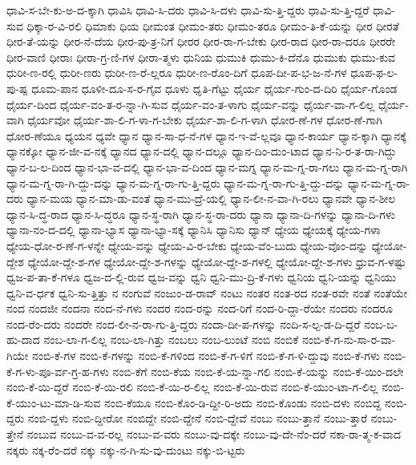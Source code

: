 {ಧಾವಿ-ಸ-ಬೇ-ಕು-ಅ-ದ-ಕ್ಕಾಗಿ
ಧಾವಿಸಿ
ಧಾವಿ-ಸಿ-ದರು
ಧಾವಿ-ಸಿ-ದಳು
ಧಾವಿ-ಸು-ತ್ತಿ-ದ್ದರು
ಧಾವಿ-ಸು-ತ್ತಿ-ದ್ದರೆ
ಧಾವಿ-ಸುವ
ಧಿಕ್ಕಾ-ರ-ವಿ-ರಲಿ
ಧಿಮಾಕು
ಧಿಯ
ಧೀಮಂತ
ಧೀಮಂ-ತರು
ಧೀಮಂ-ತರೂ
ಧೀಮಂ-ತಿ-ಕೆ-ಯನ್ನು
ಧೀರ
ಧೀರತೆ
ಧೀರ-ತೆ-ಯನ್ನು
ಧೀರ-ನೆ-ದೆಯ
ಧೀರ-ಪು-ತ್ರ-ನಿಗೆ
ಧೀರರ
ಧೀರ-ರಾ-ಗ-ಬೇಕು
ಧೀರ-ರಾದ
ಧೀರ-ರಾ-ದರೂ
ಧೀರರೇ
ಧೀರ-ವಾಣಿ
ಧೀರಾಃ
ಧೀರಾ-ಗ್ರ-ಣಿ-ಗಳ
ಧೀರಾ-ತ್ಮಳು
ಧುನಿಯ
ಧುಮುಕಿ
ಧುಮು-ಕಿ-ದೆನೊ
ಧುಮುಕು
ಧುಮು-ಕುವ
ಧುರೀ-ಣ-ರಲ್ಲಿ
ಧುರೀ-ಣರು
ಧುರೀ-ಣ-ರೆ-ಲ್ಲರೂ
ಧುರೀ-ಣ-ರೊಂ-ದಿಗೆ
ಧೂಪ-ದೀ-ಪ-ಭ-ಜ-ನೆ-ಗಳ
ಧೂಪ-ಫ-ಲ-ಪು-ಷ್ಪ
ಧೂಮ-ಪಾನ
ಧೂಳೀ-ದೂ-ಸ-ರ-ಗೈವ
ಧೂಳು
ಧೃತಿ-ಗೆಟ್ಟು
ಧೈರ್ಯ
ಧೈರ್ಯ-ಗುಂ-ದ-ದಿರಿ
ಧೈರ್ಯ-ಗೊಂಡ
ಧೈರ್ಯ-ದಿಂದ
ಧೈರ್ಯ-ವಂ-ತ-ರ-ನ್ನಾ-ಗಿ-ಸುವ
ಧೈರ್ಯ-ವಂ-ತ-ಳಾಗು
ಧೈರ್ಯ-ವನ್ನು
ಧೈರ್ಯ-ವಾ-ಗ-ಲಿಲ್ಲ
ಧೈರ್ಯ-ವಾಗಿ
ಧೈರ್ಯವೋ
ಧೈರ್ಯ-ಶಾ-ಲಿ-ಗ-ಳಾ-ಗ-ಬೇಕು
ಧೈರ್ಯ-ಶಾ-ಲಿ-ಗ-ಳಾಗಿ
ಧೋರ-ಣೆ-ಗಳ
ಧೋರ-ಣೆ-ಗಾಗಿ
ಧೋರ-ಣೆಯೂ
ಧ್ಯಯನ
ಧ್ಯವೇ
ಧ್ಯಾನ
ಧ್ಯಾನ-ಸಾ-ಧ-ನೆ-ಗಳ
ಧ್ಯಾನ-ಇ-ವೆ-ಲ್ಲವೂ
ಧ್ಯಾನ-ಕಾರ್ಯ
ಧ್ಯಾನ-ಕ್ಕಾಗಿ
ಧ್ಯಾನಕ್ಕೆ
ಧ್ಯಾನಕ್ಕೋ
ಧ್ಯಾನ-ಜೀ-ವ-ನಕ್ಕೆ
ಧ್ಯಾನದ
ಧ್ಯಾನ-ದಲ್ಲಿ
ಧ್ಯಾನ-ದಲ್ಲೂ
ಧ್ಯಾನ-ದಿಂ-ದುಂ-ಟಾದ
ಧ್ಯಾನ-ನಿ-ರ-ತ-ರಾ-ಗಿದ್ದು
ಧ್ಯಾನ-ಬ-ಲ-ದಿಂದ
ಧ್ಯಾನ-ಭಾ-ವ-ದಲ್ಲಿ
ಧ್ಯಾನ-ಭಾ-ವ-ದಿಂದ
ಧ್ಯಾನ-ಮಗ್ನ
ಧ್ಯಾನ-ಮ-ಗ್ನ-ರಾ-ಗಲು
ಧ್ಯಾನ-ಮ-ಗ್ನ-ರಾಗಿ
ಧ್ಯಾನ-ಮ-ಗ್ನ-ರಾ-ಗಿ-ದ್ದು-ದನ್ನು
ಧ್ಯಾನ-ಮ-ಗ್ನ-ರಾ-ಗು-ತ್ತಿ-ದ್ದರು
ಧ್ಯಾನ-ಮ-ಗ್ನ-ರಾ-ಗು-ತ್ತಿ-ದ್ದು-ದನ್ನು
ಧ್ಯಾನ-ಮ-ಗ್ನ-ರಾ-ದರು
ಧ್ಯಾನ-ಮಯ
ಧ್ಯಾನ-ಮಾ-ಡು-ವಂತೆ
ಧ್ಯಾನ-ಮು-ದ್ರೆ-ಯಲ್ಲಿ
ಧ್ಯಾನ-ಲೀ-ನ-ವಾ-ಗಿ-ರಲು
ಧ್ಯಾನವೇ
ಧ್ಯಾನ-ಶೀಲ
ಧ್ಯಾನ-ಸಿ-ದ್ಧ-ರಾದ
ಧ್ಯಾನ-ಸಿ-ದ್ಧರೂ
ಧ್ಯಾನ-ಸ್ಥ-ರಾಗಿ
ಧ್ಯಾನ-ಸ್ಥ-ರಾ-ದರು
ಧ್ಯಾನಾ
ಧ್ಯಾನಾ-ದಿ-ಗಳನ್ನು
ಧ್ಯಾನಾ-ದಿ-ಗಳು
ಧ್ಯಾನಾ-ನಂ-ದ-ದಲ್ಲಿ
ಧ್ಯಾನಾ-ಭ್ಯಾಸ
ಧ್ಯಾನಾ-ಭ್ಯಾ-ಸಕ್ಕೆ
ಧ್ಯಾನಿಸಿ
ಧ್ಯಾನಿಸು
ಧ್ಯಾನ್
ಧ್ಯೇಯ
ಧ್ಯೇಯಕ್ಕೆ
ಧ್ಯೇಯ-ಗಳಾ
ಧ್ಯೇಯ-ಧೋ-ರ-ಣೆ-ಗ-ಳನ್ನೇ
ಧ್ಯೇಯ-ವನ್ನು
ಧ್ಯೇಯ-ವಿ-ರ-ಬೇಕು
ಧ್ಯೇಯ-ವೆಂ-ಬುದು
ಧ್ಯೇಯ-ವೊಂ-ದನ್ನು
ಧ್ಯೇಯೋ-ದ್ದೇಶ
ಧ್ಯೇಯೋ-ದ್ದೇ-ಶ-ಗಳ
ಧ್ಯೇಯೋ-ದ್ದೇ-ಶ-ಗಳನ್ನು
ಧ್ಯೇಯೋ-ದ್ದೇ-ಶ-ಗಳಲ್ಲಿ
ಧ್ಯೇಯೋ-ದ್ದೇ-ಶ-ಗಳು
ಧ್ರುವ-ಗ-ಳಷ್ಟು
ಧ್ವಜ-ಪ-ತಾ-ಕೆ-ಗಳೂ
ಧ್ವಜ-ದ-ಲ್ಲಿ-ರುವ
ಧ್ವಜ-ವನ್ನು
ಧ್ವನಿ
ಧ್ವನಿ-ಮು-ದ್ರಿ-ಕೆ-ಗಳು
ಧ್ವನಿಯ
ಧ್ವನಿ-ಯನ್ನು
ಧ್ವನಿಯು
ಧ್ವನಿ-ವ-ರ್ಧಕ
ಧ್ವನಿ-ಸು-ತ್ತಿತ್ತು
ನ
ನಂಗುವೆ
ನಂಜುಂ-ಡ-ರಾವ್
ನಂಟು
ನಂತರ
ನಂತ-ರದ
ನಂತ-ರವೇ
ನಂತೆ
ನಂತೆಯೇ
ನಂದ
ನಂದಜೀ
ನಂದನಾ
ನಂದ-ನೆ-ಗಳು
ನಂದರ
ನಂದ-ರನ್ನು
ನಂದ-ರಿಗೆ
ನಂದ-ರಿ-ದ್ದಾ-ರೆಯೇ
ನಂದರು
ನಂದರೂ
ನಂದ-ರೆಂ-ದರು
ನಂದರೇ
ನಂದ-ಲೀ-ನ-ರಾ-ಗು-ತ್ತಿ-ದ್ದರು
ನಂದಾ-ದೀ-ಪ-ಗಳನ್ನು
ನಂದಿ-ಸ-ಲ್ಪ-ಡ-ದಿ-ದ್ದರೆ
ನಂಬ-ಬ-ಹು-ದಾದ
ನಂಬ-ಲಾ-ಗ-ಲಿಲ್ಲ
ನಂಬ-ಲಾ-ಗಿತ್ತು
ನಂಬಲು
ನಂಬ-ಲುಂಟೆ
ನಂಬಿ
ನಂಬಿಕೆ
ನಂಬಿ-ಕೆ-ಗ-ನು-ಸಾ-ರ-ವಾ-ಗಿಯೇ
ನಂಬಿ-ಕೆ-ಗಳ
ನಂಬಿ-ಕೆ-ಗಳನ್ನು
ನಂಬಿ-ಕೆ-ಗಳಿಂದ
ನಂಬಿ-ಕೆ-ಗ-ಳಿಗೆ
ನಂಬಿ-ಕೆ-ಗ-ಳಿ-ದ್ದುವು
ನಂಬಿ-ಕೆ-ಗಳು
ನಂಬಿ-ಕೆ-ಗ-ಳು-ಪೂ-ರ್ವ-ಗ್ರ-ಹ-ಗಳು
ನಂಬಿ-ಕೆಗೆ
ನಂಬಿ-ಕೆಯ
ನಂಬಿ-ಕೆ-ಯ-ನ್ನಾ-ಗಲಿ
ನಂಬಿ-ಕೆ-ಯನ್ನು
ನಂಬಿ-ಕೆ-ಯಿಂ-ದಲೇ
ನಂಬಿ-ಕೆ-ಯಿ-ದ್ದರೆ
ನಂಬಿ-ಕೆ-ಯಿ-ರಲಿ
ನಂಬಿ-ಕೆ-ಯಿ-ರ-ಲಿಲ್ಲ
ನಂಬಿ-ಕೆ-ಯಿ-ರುವ
ನಂಬಿ-ಕೆ-ಯುಂ-ಟಾ-ಗ-ಲಿಲ್ಲ
ನಂಬಿ-ಕೆ-ಯುಂ-ಟು-ಮಾ-ಡಿ-ಸುವ
ನಂಬಿ-ಕೆಯೂ
ನಂಬಿ-ಕೊಂ-ಡಿ-ದ್ದೀ-ರಿ-ಅದು
ನಂಬಿ-ಕೊಂಡು
ನಂಬಿ-ದಳು
ನಂಬಿದ್ದ
ನಂಬಿ-ದ್ದರು
ನಂಬಿ-ದ್ದಳು
ನಂಬಿ-ದ್ದೀರೋ
ನಂಬಿದ್ದೇ
ನಂಬಿ-ದ್ದೇನೆ
ನಂಬಿ-ದ್ದೇವೆ
ನಂಬು
ನಂಬು-ತ್ತಾನೆ
ನಂಬು-ತ್ತಾರೆ
ನಂಬು-ತ್ತೇನೆ
ನಂಬುವ
ನಂಬು-ವ-ವ-ರಲ್ಲ
ನಂಬು-ವ-ವರು
ನಂಬು-ವು-ದಕ್ಕೇ
ನಂಬು-ವು-ದೇ-ನೆಂ-ದರೆ
ನಕಾ-ರಾ-ತ್ಮ-ಕ-ವಾದ
ನಕ್ಕರು
ನಕ್ಕ-ರೆಂ-ದರೆ
ನಕ್ಕು
ನಕ್ಕು-ನ-ಗಿ-ಸು-ವು-ದುಂಟು
ನಕ್ಕು-ಬಿ-ಟ್ಟರು
}

